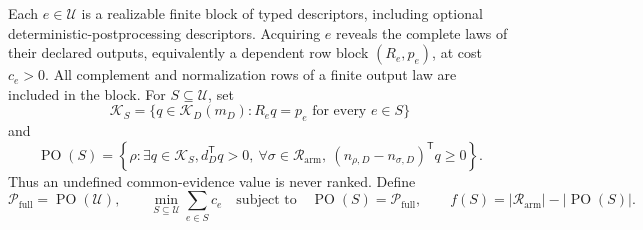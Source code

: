 Each \(e\in\mathcal U\) is a realizable finite block of typed descriptors, including optional deterministic-postprocessing descriptors.  Acquiring \(e\) reveals the complete laws of their declared outputs, equivalently a dependent row block \((R_e,p_e)\), at cost \(c_e>0\).  All complement and normalization rows of a finite output law are included in the block.  For \(S\subseteq\mathcal U\), set
\[
\mathcal K_S=\{q\in\mathcal K_D(m_D):R_eq=p_e\text{ for every }e\in S\}
\]
and
\[
\operatorname{PO}(S)=\left\{\rho:\exists q\in\mathcal K_S, d_D^{\mathsf T}q>0,
\ \forall\sigma\in\mathcal R_{\mathrm{arm}},\
(n_{\rho,D}-n_{\sigma,D})^{\mathsf T}q\geq0\right\}.
\]
Thus an undefined common-evidence value is never ranked.  Define
\[
\mathcal P_{\mathrm{full}}=\operatorname{PO}(\mathcal U),
\qquad
\min_{S\subseteq\mathcal U}\sum_{e\in S}c_e
\quad\text{subject to}\quad
\operatorname{PO}(S)=\mathcal P_{\mathrm{full}},
\qquad
f(S)=|\mathcal R_{\mathrm{arm}}|-|\operatorname{PO}(S)|.
\]